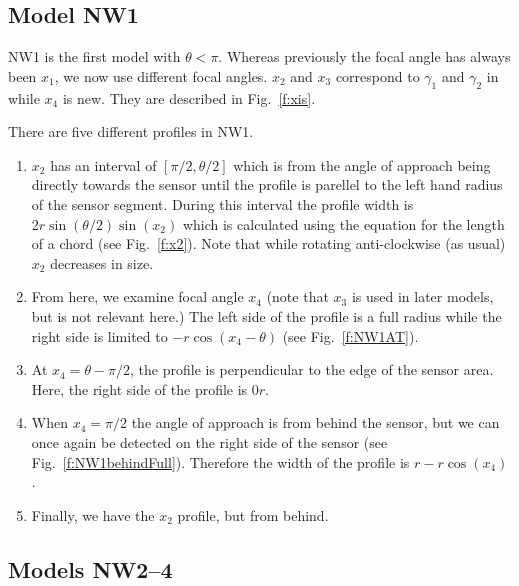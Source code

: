 \subsection{Model NW1} \label{NW1}

NW1 is the first model with $\theta < \pi$. Whereas previously the focal angle has always been $x_1$, we now use different focal angles. $x_2$ and $x_3$ correspond to $\gamma_1$ and $\gamma_2$ in \cite{rowcliffe2008estimating} while $x_4$ is new. They are described in Fig.~\ref{f:xis}. 

There are five different profiles in NW1.
\begin{enumerate}
\item $x_2$ has an interval of $[\pi/2, \theta/2]$ which is from the angle of approach being directly towards the sensor until the profile is parellel to the left hand radius of the sensor segment. During this interval the profile width is $2r\sin\left(\theta/2\right)\sin(x_2)$ which is calculated using the equation for the length of a chord (see Fig.~\ref{f:x2}). Note that while rotating anti-clockwise (as usual) $x_2$ decreases in size.
\item From here, we examine focal angle $x_4$ (note that $x_3$ is used in later models, but is not relevant here.)  The left side of the profile is a full radius while the right side is limited to $- r\cos(x_4 - \theta)$ (see Fig.~\ref{f:NW1AT}).
\item At $x_4 =  \theta - \pi/2$, the profile is perpendicular to the edge of the sensor area. Here, the right side of the profile is $0r$.
\item When $x_4 = \pi/2$ the angle of approach is from behind the sensor, but we can once again be detected on the right side of the sensor (see Fig.~\ref{f:NW1behindFull}). Therefore the width of the profile is $r - r\cos(x_4)$.
\item  Finally, we have the $x_2$ profile, but from behind. 
\end{enumerate}





\subsection{Models NW2--4} \label{NW2--4}

